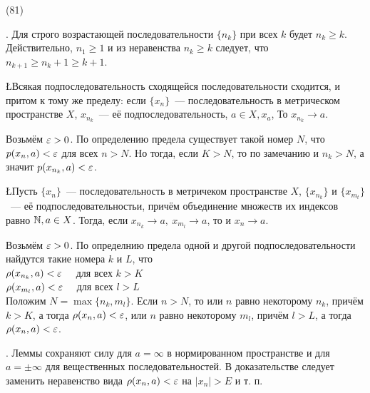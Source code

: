 (81)

. Для строго возрастающей последовательности $\{n_k\}$ при всех $k$ будет $n_k \ge k$. Действительно, $n_1 \ge 1$ и из неравенства $n_k \ge k$ следует, что $n_{k + 1} \ge n_k + 1 \ge k + 1$.

\L Всякая подпоследовательность сходящейся последовательности сходится, и притом к тому же пределу: если $\{x_n\}$~--- последовательность в метрическом пространстве $X$, $x_{n_k}$~--- её подпоследовательность, $a \in X, x_a$, То $x_{n_k} \to a$.

\D Возьмём $\varepsilon > 0$. По определению предела существует такой номер $N$, что $p(x_n, a) < \varepsilon$ для всех $n > N$. Но тогда, если $K > N$, то по замечанию и $n_k > N$, а значит $p(x_{n _k}, a) < \varepsilon$.

\L Пусть $\{x_n\}$~--- последовательность в метричеком пространстве $X$, $\{x_{n_k}\}$ и $\{x_{m_t}\}$~--- её подпоследовательностьи, причём объединение множеств их индексов равно $\mathbb{N}, a \in X$. Тогда, если $x_{n_k} \to a,\ x_{m_l}\to a$, то и $x_n \to a$.

\D Возьмём $\varepsilon > 0$. По определнию предела одной и другой подпоследовательности найдутся такие номера $k$ и $L$, что\\
$\rho(x_{n_k}, a) < \varepsilon\quad$ для всех $k > K$\\
$\rho(x_{m_l}, a) < \varepsilon\quad$ для всех $l > L$\\
Положим $N = \max\{n_k, m_l\}$. Если $n > N$, то или $n$ равно некоторому $n_k$, причём $k > K$, а тогда $\rho(x_n, a)< \varepsilon$, или $n$ равно некоторому $m_l$, причём $l > L$, а тогда $\rho(x_n, a) < \varepsilon$.

. Леммы сохраняют силу для $a = \infty$ в нормированном пространстве и для $a = \pm \infty$ для вещественных последовательностей. В доказательстве следует заменить неравенство вида $\rho(x_n, a) < \varepsilon$ на $|x_n| > E$ и т. п.